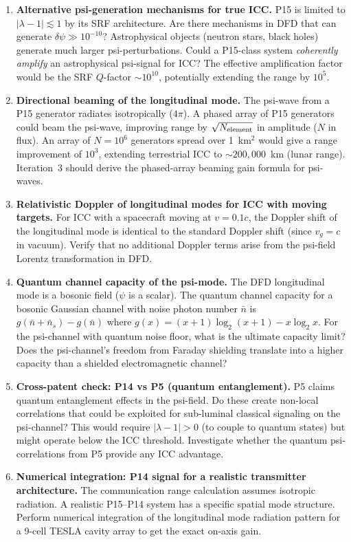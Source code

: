 \documentclass[11pt]{article}
\begin{document}
\begin{enumerate}[leftmargin=*]

\item \textbf{Alternative psi-generation mechanisms for true ICC.}
P15 is limited to $|\lambda-1| \lesssim 1$ by its SRF architecture.
Are there mechanisms in DFD that can generate $\delta\psi \gg 10^{-10}$?
Astrophysical objects (neutron stars, black holes) generate much
larger psi-perturbations. Could a P15-class system \textit{coherently
amplify} an astrophysical psi-signal for ICC? The effective amplification
factor would be the SRF $Q$-factor $\sim 10^{10}$, potentially
extending the range by $10^5$.

\item \textbf{Directional beaming of the longitudinal mode.}
The psi-wave from a P15 generator radiates isotropically ($4\pi$).
A phased array of P15 generators could beam the psi-wave, improving
range by $\sqrt{N_{\rm element}}$ in amplitude ($N$ in flux).
An array of $N = 10^6$ generators spread over 1~km$^2$ would give
a range improvement of $10^3$, extending terrestrial ICC to
$\sim 200,000$~km (lunar range). Iteration~3 should derive the
phased-array beaming gain formula for psi-waves.

\item \textbf{Relativistic Doppler of longitudinal modes for ICC with moving targets.}
For ICC with a spacecraft moving at $v = 0.1c$, the Doppler shift
of the longitudinal mode is identical to the standard Doppler shift
(since $v_g = c$ in vacuum). Verify that no additional Doppler terms
arise from the psi-field Lorentz transformation in DFD.

\item \textbf{Quantum channel capacity of the psi-mode.}
The DFD longitudinal mode is a bosonic field ($\psi$ is a scalar).
The quantum channel capacity for a bosonic Gaussian channel with
noise photon number $\bar{n}$ is $g(\bar{n} + \bar{n}_s) - g(\bar{n})$
where $g(x) = (x+1)\log_2(x+1) - x\log_2 x$.
For the psi-channel with quantum noise floor, what is the ultimate
capacity limit? Does the psi-channel's freedom from Faraday shielding
translate into a higher capacity than a shielded electromagnetic channel?

\item \textbf{Cross-patent check: P14 vs P5 (quantum entanglement).}
P5 claims quantum entanglement effects in the psi-field. Do these
create non-local correlations that could be exploited for
sub-luminal classical signaling on the psi-channel? This would
require $|\lambda-1| > 0$ (to couple to quantum states) but might
operate below the ICC threshold. Investigate whether the quantum
psi-correlations from P5 provide any ICC advantage.

\item \textbf{Numerical integration: P14 signal for a realistic transmitter architecture.}
The communication range calculation assumes isotropic radiation.
A realistic P15--P14 system has a specific spatial mode structure.
Perform numerical integration of the longitudinal mode radiation
pattern for a 9-cell TESLA cavity array to get the exact on-axis
gain.

\end{enumerate}
\end{document}
